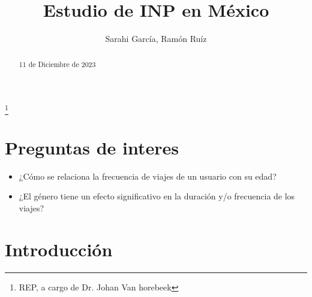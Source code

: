 \documentclass[letterpaper,spanish,reprint,nofootinbib,showkeys,aps]{revtex4-2}
\begin{document}
\title{\Large{\textbf{Estudio de INP en México}}}
\author{Sarahi García, Ramón Ruíz}
\thanks{REP, a  cargo de Dr. Johan Van horebeek}



\begin{abstract}
\begin{center}
\small{11 de Diciembre de 2023}
\end{center}
\vspace{0.6cm}


\end{abstract}

\maketitle




\section{Preguntas de interes}

\begin{itemize}
\item ¿Cómo se relaciona la frecuencia de viajes de un usuario con su edad?
\item ¿El género tiene un efecto significativo en la duración y/o frecuencia de los viajes?
\end{itemize}

\section{Introducción}
\end{document}
